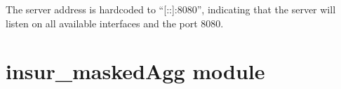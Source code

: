 \documentclass[letterpaper,10pt,english]{sphinxmanual}
\begin{document}
\begin{fulllineitems}
\begin{description}
\sphinxAtStartPar
The server address is hardcoded to “{[}::{]}:8080”, indicating that the server will listen on all available interfaces and the port 8080.

\begin{description}
\sphinxAtStartPar
{}

\end{description}

\end{description}

\end{fulllineitems}


\sphinxstepscope


\section{insur\_maskedAgg module}
\label{\detokenize{insur_maskedAgg:module-insur_maskedAgg}}\label{\detokenize{insur_maskedAgg:insur-maskedagg-module}}\label{\detokenize{insur_maskedAgg::doc}}
\end{document}
